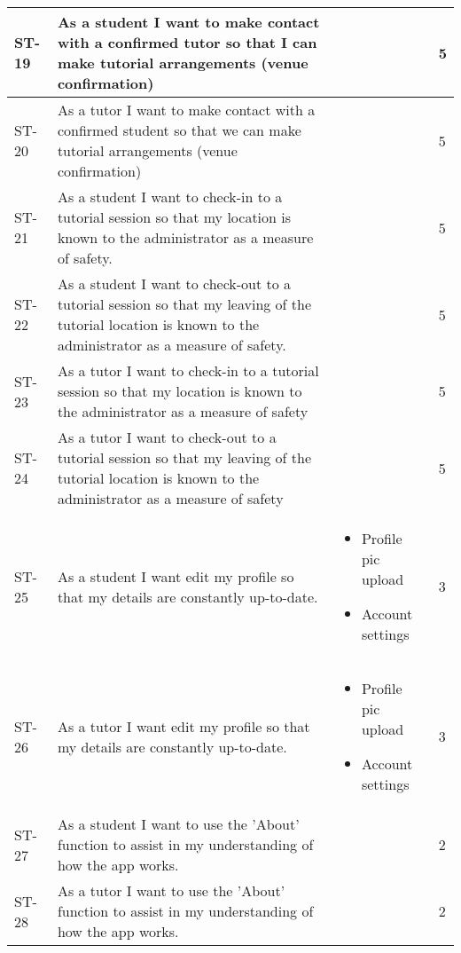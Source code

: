 \documentclass[12pt]{article}
\begin{document}
{\begin{longtable}{| p{1cm} | p{7cm}| p{5cm} | p{1cm} |}
			\\ \hline ST-19 & As a student I want to make contact with a confirmed tutor so that I can make tutorial arrangements (venue confirmation) & &5 
			
			\\ \hline ST-20 &As a tutor I want to make contact with a confirmed student so that we can make tutorial arrangements (venue confirmation)  & &5

			\\ \hline ST-21 & As a student I want to check-in to a tutorial session so that my location is known to the administrator as a measure of safety.  & &5 
			
			\\ \hline ST-22 & As a student I want to check-out to a tutorial session so that my leaving of the tutorial location is known to the administrator as a measure of safety.  & &5 
			
			\\ \hline ST-23 & As a tutor I want to check-in to a tutorial session so that my location is known to the administrator as a measure of safety  & &5 
			
			\\ \hline ST-24 & As a tutor I want to check-out to a tutorial session so that my leaving of the tutorial location is known to the administrator as a measure of safety  & &5 
			
			
			\\ \hline ST-25 & As a student I want edit my profile so that my details are constantly up-to-date.  & \begin{itemize}
			\item Profile pic upload
			\item Account settings
\end{itemize}			 &3
			
			
			\\ \hline ST-26 & As a tutor I want edit my profile so that my details are constantly up-to-date.  &  \begin{itemize}
			\item Profile pic upload
			\item Account settings
\end{itemize} &3 

			\\ \hline ST-27 & As a student I want to use the 'About' function to assist in my understanding of how the app works.  & &2
			
			\\ \hline ST-28 & As a tutor I want to use the 'About' function to assist in my understanding of how the app works.  & &2 
						

\end{longtable}}
\end{document}
